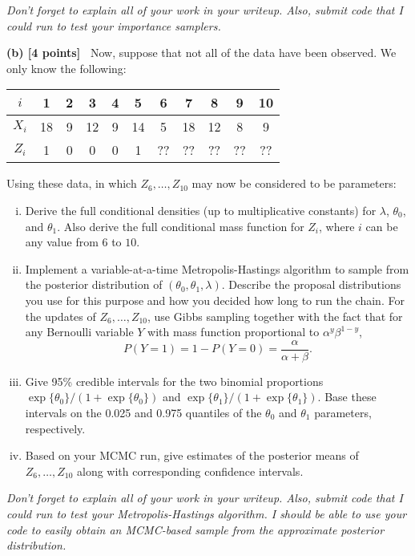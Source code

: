 \documentclass{article}
\newcommand{\svskip}{\vspace{.2in}}
\begin{document}
{\em Don't forget to explain all of your work in your writeup.  Also,
submit code that I could run to test your importance samplers.}

\svskip
{\bf (b) [4 points]\ }
Now, suppose that not all of the data have been observed.  We
only know the following:

\svskip
\begin{tabular}{c|cccccccccc}
$i$ & 1 & 2 & 3 & 4 & 5 & 6 & 7 & 8 & 9 & 10 \\ \hline
$X_i$ & 18 & 9 & 12 & 9 & 14 & 5 & 18 & 12 & 8 & 9 \\ \hline
$Z_i$ & 1 & 0 & 0 & 0 & 1 & ?? & ?? & ?? & ?? & ?? 
\end{tabular}

\svskip
Using these data, in which $Z_6, \ldots, Z_{10}$ may now be considered
to be parameters:

\begin{enumerate}[(i)]
\item 
Derive the full conditional densities 
(up to multiplicative constants) for $\lambda$, 
$\theta_0$, and $\theta_1$.  Also derive the full conditional 
mass function for $Z_i$, where $i$ can be any value from $6$ 
to $10$.
\item 
Implement a variable-at-a-time Metropolis-Hastings algorithm to sample
from the posterior distribution of 
$(\theta_0, \theta_1, \lambda)$.  Describe the proposal distributions you
use for this purpose and how you decided how long to run the chain.
For the updates of $Z_6, \ldots, Z_{10}$, use Gibbs sampling together with
the fact that for any Bernoulli variable $Y$ with mass function proportional
to $\alpha^y\beta^{1-y}$,
\[
P(Y=1) = 1-P(Y=0) = \frac{\alpha}{\alpha+\beta}.
\]
\item 
Give 95\% credible intervals for the two binomial 
proportions $\exp\{\theta_0\} / (1+\exp\{\theta_0\})$ and
$\exp\{\theta_1\} / (1+\exp\{\theta_1\})$.  Base these intervals
on the 0.025 and 0.975 quantiles of the $\theta_0$ and $\theta_1$
parameters, respectively.
\item 
Based on your MCMC run, give estimates of the 
posterior means of $Z_6, \ldots, Z_{10}$ along with 
corresponding confidence intervals.
\end{enumerate}

{\em Don't forget to explain all of your work in your writeup.  Also,
submit code that I could run to test your Metropolis-Hastings algorithm.  
I should be able to use your code to easily obtain an MCMC-based sample from 
the approximate posterior distribution.}
\end{document}
